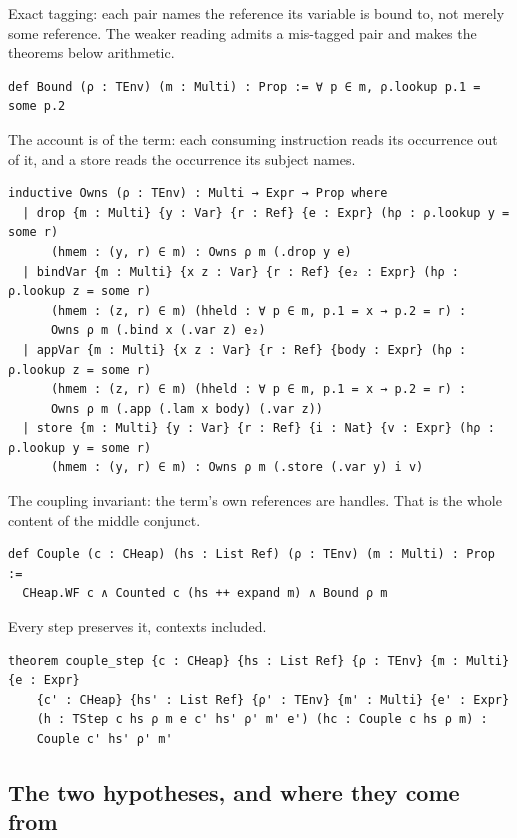 \documentclass[11pt]{article}
\theoremstyle{remark}
\begin{document}
\noindent Exact tagging: each pair names the reference its variable is bound to, not
merely some reference. The weaker reading admits a mis-tagged pair and makes the
theorems below arithmetic.

\begin{lstlisting}
def Bound (ρ : TEnv) (m : Multi) : Prop := ∀ p ∈ m, ρ.lookup p.1 = some p.2
\end{lstlisting}

\noindent The account is of the term: each consuming instruction reads its
occurrence out of it, and a store reads the occurrence its subject names.

\begin{lstlisting}
inductive Owns (ρ : TEnv) : Multi → Expr → Prop where
  | drop {m : Multi} {y : Var} {r : Ref} {e : Expr} (hρ : ρ.lookup y = some r)
      (hmem : (y, r) ∈ m) : Owns ρ m (.drop y e)
  | bindVar {m : Multi} {x z : Var} {r : Ref} {e₂ : Expr} (hρ : ρ.lookup z = some r)
      (hmem : (z, r) ∈ m) (hheld : ∀ p ∈ m, p.1 = x → p.2 = r) :
      Owns ρ m (.bind x (.var z) e₂)
  | appVar {m : Multi} {x z : Var} {r : Ref} {body : Expr} (hρ : ρ.lookup z = some r)
      (hmem : (z, r) ∈ m) (hheld : ∀ p ∈ m, p.1 = x → p.2 = r) :
      Owns ρ m (.app (.lam x body) (.var z))
  | store {m : Multi} {y : Var} {r : Ref} {i : Nat} {v : Expr} (hρ : ρ.lookup y = some r)
      (hmem : (y, r) ∈ m) : Owns ρ m (.store (.var y) i v)
\end{lstlisting}

\noindent The coupling invariant: the term's own references are handles. That is the
whole content of the middle conjunct.

\begin{lstlisting}
def Couple (c : CHeap) (hs : List Ref) (ρ : TEnv) (m : Multi) : Prop :=
  CHeap.WF c ∧ Counted c (hs ++ expand m) ∧ Bound ρ m
\end{lstlisting}

\noindent Every step preserves it, contexts included.

\begin{lstlisting}
theorem couple_step {c : CHeap} {hs : List Ref} {ρ : TEnv} {m : Multi} {e : Expr}
    {c' : CHeap} {hs' : List Ref} {ρ' : TEnv} {m' : Multi} {e' : Expr}
    (h : TStep c hs ρ m e c' hs' ρ' m' e') (hc : Couple c hs ρ m) :
    Couple c' hs' ρ' m'
\end{lstlisting}

\subsection{The two hypotheses, and where they come from}
\label{sec:pair}
\end{document}
